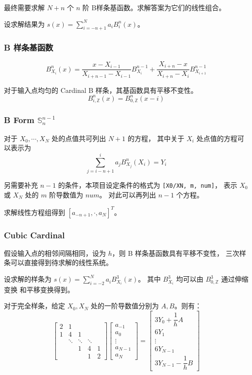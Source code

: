 \documentclass[lang=cn,a4paper,newtx,bibend=bibtex]{elegantpaper}
\newcommand{\SBB}{\mathbb{S}}
\begin{document}
最终需要求解 $N+n$ 个 $n$ 阶 B样条基函数。求解答案为它们的线性组合。

设求解结果为 $s(x) = \sum\limits_{i = -n+1}^{N} a_i B_{i}^n(x)$。

\subsubsection{B 样条基函数}

\[
  B_{X_i}^{n}(x) = \dfrac{x - X_{i-1}}{X_{i + n - 1} - X_{i - 1}}B_{X_i}^{n-1} + \dfrac{X_{i+n} - x}{X_{i+n} - X_i}B_{X_{i+1}}^{n-1}
\]

对于输入点均匀的 Cardinal B 样条，其基函数具有平移不变性。
\[
  B_{i,\mathbb{Z}}^{n}(x) = B_{0, \mathbb{Z}}^{n}(x-i)
\]

\subsubsection{B Form $\SBB_n^{n-1}$}

对于 $X_0, \cdots, X_N$ 处的点值共可列出 $N+1$ 的方程，
其中关于 $X_i$ 处点值的方程可以表示为 
\[\sum_{j=i-n+1}^i a_j B_{X_j}^n(X_i) =Y_i\]

另需要补充 $n-1$ 的条件，本项目设定条件的格式为
\lstinline{[X0/XN, m, num]}，
表示 $X_0$ 或 $X_N$ 处的 $m$ 阶导数值为 $num$。
对此可以再列出 $n-1$ 个方程。

求解线性方程组得到 $[a_{-n+1}, \cdot, a_N]^T$。


\subsubsection{Cubic Cardinal}

假设输入点的相邻间隔相同，设为 $h$，则 B 样条基函数具有平移不变性，
三次样条可以直接得到待求解的线性系统。

设求解的样条为 $s(x) = \sum_{i = -2}^N a_i B_{X_i}^3(x)$。
其中 $B_{X_i}^3$ 均可以由 $B_{0, \mathbb{Z}}^3$ 通过伸缩变换
和平移变换得到。

对于完全样条，给定 $X_0, X_N$ 处的一阶导数值分别为 $A, B$。则有：
\[
  \begin{bmatrix}
    2 & 1 &   &  & \\
    1 & 4 & 1 &  & \\
     & \ddots & \ddots &\ddots & \\
    & & 1 & 4 & 1 \\
    & & & 1 & 2
  \end{bmatrix}
  \begin{bmatrix}
    a_{-1} \\
    a_{0} \\
    \vdots \\
    a_{N-1} \\
    a_{N}
  \end{bmatrix}
   = 
  \begin{bmatrix}
    3Y_0 + \dfrac1h A \\
    6Y_1 \\
    \vdots \\
    6Y_{N-1} \\
    3Y_{N-1} - \dfrac1h B
  \end{bmatrix}
\]
\end{document}
